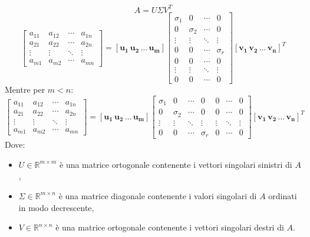 \documentclass[11pt]{article}
\begin{document}
\[
A = U \Sigma V^T
\]
\[
\begin{bmatrix}
a_{11} & a_{12} & \cdots & a_{1n} \\
a_{21} & a_{22} & \cdots & a_{2n} \\
\vdots & \vdots & \ddots & \vdots \\
a_{m1} & a_{m2} & \cdots & a_{mn}
\end{bmatrix} = \mathbf{[u_1 \, u_2 \, \dots \, u_m]} \begin{bmatrix}
\sigma_1 & 0 & \cdots & 0 \\
0 & \sigma_2 & \cdots & 0 \\
\vdots & \vdots & \ddots & \vdots \\
0 & 0 & \cdots & \sigma_r \\
0 & 0 & \cdots & 0 \\
\vdots & \vdots & \ddots & \vdots \\
0 & 0 & \cdots & 0
\end{bmatrix} \mathbf{[v_1 \, v_2 \, \dots \, v_n]}^T
\]
Mentre per $m<n$:
\[
\begin{bmatrix}
a_{11} & a_{12} & \cdots & a_{1n} \\
a_{21} & a_{22} & \cdots & a_{2n} \\
\vdots & \vdots & \ddots & \vdots \\
a_{m1} & a_{m2} & \cdots & a_{mn}
\end{bmatrix} = \mathbf{[u_1 \, u_2 \, \dots \, u_m]}
\begin{bmatrix}
\sigma_1 & 0 & \cdots & 0 & 0 & \cdots & 0 \\
0 & \sigma_2 & \cdots & 0 & 0 & \cdots & 0 \\
\vdots & \vdots & \ddots & \vdots & \vdots & \ddots & \vdots \\
0 & 0 & \cdots & \sigma_r & 0 & \cdots & 0
\end{bmatrix} \mathbf{[v_1 \, v_2 \, \dots \, v_n]}^T
\]
Dove:
\begin{itemize}
    \item $U\in\mathbb{R}^{m\times m}$ è una matrice ortogonale contenente i vettori singolari sinistri di $A$,
    \item $\Sigma\in\mathbb{R}^{m\times n}$ è una matrice diagonale contenente i valori singolari di $A$ ordinati in modo decrescente,
    \item $V\in\mathbb{R}^{n\times n}$ è una matrice ortogonale contenente i vettori singolari destri di $A$.
\end{itemize}
\end{document}
